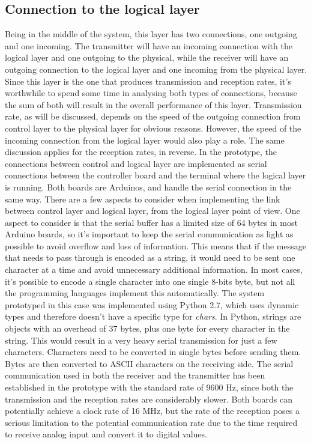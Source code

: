 \subsection{Connection to the logical layer}
Being in the middle of the system, this layer has two connections, one outgoing and one incoming.
The transmitter will have an incoming connection with the logical layer and one outgoing to the physical, while the receiver will have an outgoing connection to the logical layer and one incoming from the physical layer.
Since this layer is the one that produces transmission and reception rates, it's worthwhile to spend some time in analysing both types of connections, because the sum of both will result in the overall performance of this layer.
Transmission rate, as will be discussed, depends on the speed of the outgoing connection from control layer to the physical layer for obvious reasons.
However, the speed of the incoming connection from the logical layer would also play a role.
The same discussion applies for the reception rates, in reverse.
In the prototype, the connections between control and logical layer are implemented as serial connections between the controller board and the terminal where the logical layer is running.
Both boards are Arduinos, and handle the serial connection in the same way.
There are a few aspects to consider when implementing the link between control layer and logical layer, from the logical layer point of view.
One aspect to consider is that the serial buffer has a limited size of 64 bytes in most Arduino boards, so it's important to keep the serial communication as light as possible to avoid overflow and loss of information.
This means that if the message that needs to pass through is encoded as a string, it would need to be sent one character at a time and avoid unnecessary additional information.
In most cases, it's possible to encode a single character into one single 8-bits byte, but not all the programming languages implement this automatically.
The system prototyped in this case was implemented using Python 2.7, which uses dynamic types and therefore doesn't have a specific type for \textit{chars}. 
In Python, strings are objects with an overhead of 37 bytes, plus one byte for every character in the string.
This would result in a very heavy serial transmission for just a few characters. Characters need to be converted in single bytes before sending them. 
Bytes are then converted to ASCII characters on the receiving side.
The serial communication used in both the receiver and the transmitter has been established in the prototype with the standard rate of 9600 Hz, since both the transmission and the reception rates are considerably slower.
Both boards can potentially achieve a clock rate of 16 MHz, but the rate of the reception poses a serious limitation to the potential communication rate due to the time required to receive analog input and convert it to digital values.

